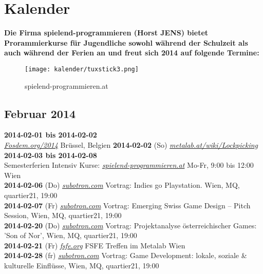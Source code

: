 \section*{Kalender}
\hypertarget{kalender}{}
\label{kalender}

\textbf{Die Firma spielend-programmieren (Horst JENS)  bietet Prorammierkurse für Jugendliche sowohl während der Schulzeit als auch während der Ferien an und freut sich 2014 auf folgende Termine:} 
\begin{figure}
\texttt{[image: kalender/tuxstick3.png]}\\
\caption{spielend-programmieren.at}
\end{figure}
\subsection*{Februar 2014}
\textbf{2014-02-01 bis 2014-02-02}\\ \href{https://fosdem.org/2014/}{\textit{Fosdem.org/2014}} Brüssel, Belgien
\textbf{2014-02-02} (So) \href{https://metalab.at/wiki/Lockpicking}{\textit{metalab.at/wiki/Lockpicking}}\\
\textbf{2014-02-03 bis 2014-02-08}\\ Semesterferien Intensiv Kurse: \href{http://spielend-programmieren.at}{\textit{spielend-programmieren.at}} Mo-Fr, 9:00 bis 12:00 Wien\\ 
\textbf{2014-02-06} (Do) \href{http://subotron.com/veranstaltung/playstationheartsdevs/}{\textit{subotron.com}} Vortrag: Indies go Playstation. Wien, MQ, quartier21, 19:00\\
\textbf{2014-02-07} (Fr) \href{http://subotron.com/veranstaltung/emerging-swiss-game-design/}{\textit{subotron.com}} Vortrag: Emerging Swiss Game Design – Pitch Session, Wien, MQ, quartier21, 19:00\\
\textbf{2014-02-20} (Do) \href{http://subotron.com/veranstaltung/son-of-nor/}{\textit{subotron.com}} Vortrag: Projektanalyse österreichischer Games: 'Son of Nor', Wien, MQ, quartier21, 19:00\\
\textbf{2014-02-21} (Fr) \href{http://fsfe.org}{\textit{fsfe.org}} FSFE Treffen im Metalab Wien\\
\textbf{2014-02-28} (fr) \href{http://subotron.com/veranstaltung/local-social-cultural/}{\textit{subotron.com}} Vortrag: Game Development: lokale, soziale \& kulturelle Einflüsse, Wien, MQ, quartier21, 19:00\\
